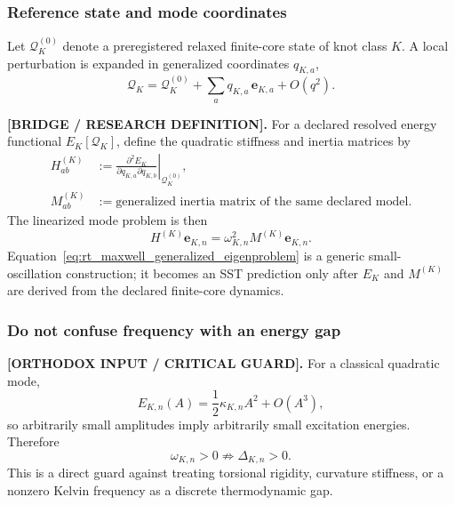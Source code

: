\subsubsection{Reference state and mode coordinates}

Let $\mathcal Q_K^{(0)}$ denote a preregistered relaxed finite-core state of
knot class $K$.  A local perturbation is expanded in generalized coordinates
$q_{K,a}$,
\begin{equation}
    \mathcal Q_K
    =
    \mathcal Q_K^{(0)}
    +
    \sum_a q_{K,a}\,\mathbf e_{K,a}
    +
    O(q^2).
    \label{eq:rt_maxwell_mode_expansion}
\end{equation}

\textbf{[BRIDGE / RESEARCH DEFINITION].}
For a declared resolved energy functional $E_K[\mathcal Q_K]$, define the
quadratic stiffness and inertia matrices by
\begin{align}
    H^{(K)}_{ab}
    &:={}
    \left.
    \frac{\partial^2 E_K}{\partial q_{K,a}\partial q_{K,b}}
    \right|_{\mathcal Q_K^{(0)}},
    \label{eq:rt_maxwell_hessian}\\
    M^{(K)}_{ab}
    &:={}
    \text{generalized inertia matrix of the same declared model}.
    \label{eq:rt_maxwell_inertia_matrix}
\end{align}
The linearized mode problem is then
\begin{equation}
    H^{(K)}\mathbf e_{K,n}
    =
    \omega_{K,n}^{2}
    M^{(K)}\mathbf e_{K,n}.
    \label{eq:rt_maxwell_generalized_eigenproblem}
\end{equation}
Equation~\eqref{eq:rt_maxwell_generalized_eigenproblem} is a generic small-
oscillation construction; it becomes an SST prediction only after $E_K$ and
$M^{(K)}$ are derived from the declared finite-core dynamics.

\subsubsection{Do not confuse frequency with an energy gap}

\textbf{[ORTHODOX INPUT / CRITICAL GUARD].}
For a classical quadratic mode,
\begin{equation}
    E_{K,n}(A)
    =
    \frac12 \kappa_{K,n}A^2 + O(A^3),
    \label{eq:rt_maxwell_classical_mode_energy}
\end{equation}
so arbitrarily small amplitudes imply arbitrarily small excitation energies.
Therefore
\begin{equation}
    \omega_{K,n}>0
    \not\Rightarrow
    \Delta_{K,n}>0 .
    \label{eq:rt_maxwell_frequency_gap_noimplication}
\end{equation}
This is a direct guard against treating torsional rigidity, curvature stiffness,
or a nonzero Kelvin frequency as a discrete thermodynamic gap.

